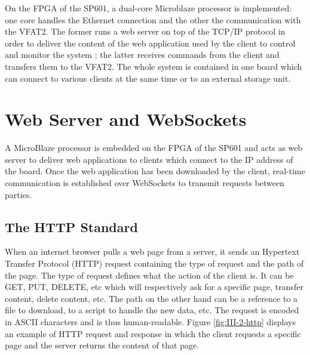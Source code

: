     On the FPGA of the SP601, a dual-core Microblaze processor is implemented: one core handles the Ethernet connection and the other the communication with the VFAT2. The former runs a web server on top of the TCP/IP protocol in order to deliver the content of the web application used by the client to control and monitor the system ; the latter receives commands from the client and transfers them to the VFAT2. The whole system is contained in one board which can connect to various clients at the same time or to an external storage unit.

  \section{Web Server and WebSockets}

    A MicroBlaze processor is embedded on the FPGA of the SP601 and acts as web server to deliver web applications to clients which connect to the IP address of the board. Once the web application has been downloaded by the client, real-time communication is established over WebSockets to transmit requests between parties.

    \subsection{The HTTP Standard}

      When an internet browser pulls a web page from a server, it sends an Hypertext Transfer Protocol (HTTP) request containing the type of request and the path of the page. The type of request defines what the action of the client is. It can be GET, PUT, DELETE, etc which will respectively ask for a specific page, transfer content, delete content, etc. The path on the other hand can be a reference to a file to download, to a script to handle the new data, etc. The request is encoded in ASCII characters and is thus human-readable. Figure \ref{fig:III-2-http} displays an example of HTTP request and response in which the client requests a specific page and the server returns the content of that page. \\

